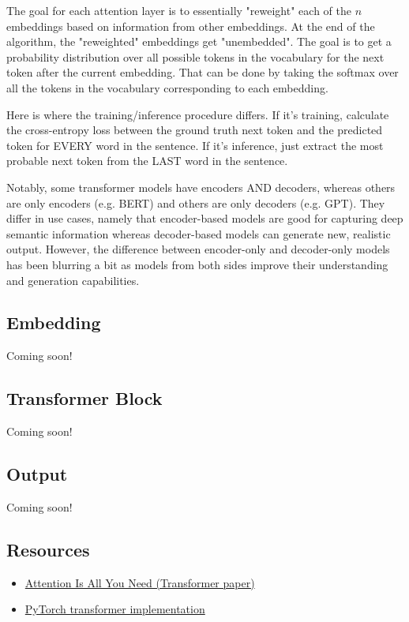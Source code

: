 \documentclass[12pt]{article}
\begin{document}
The goal for each attention layer is to essentially "reweight" each of the $n$ embeddings based on information from other embeddings. At the end of the algorithm, the "reweighted" embeddings get "unembedded". The goal is to get a probability distribution over all possible tokens in the vocabulary for the next token after the current embedding. That can be done by taking the softmax over all the tokens in the vocabulary corresponding to each embedding. 

Here is where the training/inference procedure differs. If it's training, calculate the cross-entropy loss between the ground truth next token and the predicted token for EVERY word in the sentence. If it's inference, just extract the most probable next token from the LAST word in the sentence. 

Notably, some transformer models have encoders AND decoders, whereas others are only encoders (e.g. BERT) and others are only decoders (e.g. GPT). They differ in use cases, namely that encoder-based models are good for capturing deep semantic information whereas decoder-based models can generate new, realistic output. However, the difference between encoder-only and decoder-only models has been blurring a bit as models from both sides improve their understanding and generation capabilities. 

\subsection{Embedding}
Coming soon!
\subsection{Transformer Block}
Coming soon!
\subsection{Output}
Coming soon!
\subsection{Resources}
\begin{itemize}
  \item \href{https://arxiv.org/pdf/1706.03762}{Attention Is All You Need (Transformer paper)}
  
  \item \href{https://github.com/hyunwoongko/transformer}{PyTorch transformer implementation}
\end{itemize}
\end{document}
